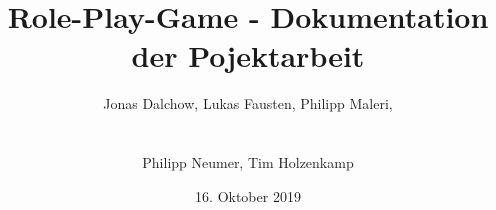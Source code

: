 \usepackage{hyperref}

\usepackage{titleref}

\usepackage{eurosym}

\usepackage{enumitem}




\usepackage{listings}  


\usepackage{setspace}

\usepackage{tocbibind}

\usepackage{pdfpages}

\usepackage{amssymb}
\usepackage{amsmath}
\usepackage{amsthm}

\usepackage{arcs}


\usepackage{xcolor}
\usepackage{listings}
\lstset{
	numbers=left, 
	numberstyle=\small, 
	numbersep=8pt,
	language=JAVA, 
	frame = single, 
	framexleftmargin=15pt}

\setlength{\parindent}{0em}

\usepackage[paper=a4paper,left=30mm,right=30mm,top=30mm,bottom=30mm]{geometry} 




\usepackage{contour}
\usepackage{ulem}

\renewcommand{\ULdepth}{1.8pt}
\contourlength{0.8pt}

\newcommand{\myuline}[1]{%
  \uline{\phantom{#1}}%
  \llap{\contour{white}{#1}}%
}

\setcounter{tocdepth}{4}
\setcounter{secnumdepth}{4}



\title{Role-Play-Game - Dokumentation der Pojektarbeit}
\author{\centerline{Jonas Dalchow, Lukas Fausten, Philipp Maleri,} \\ \centerline{Philipp Neumer, Tim Holzenkamp}}
\date{16. Oktober 2019}

